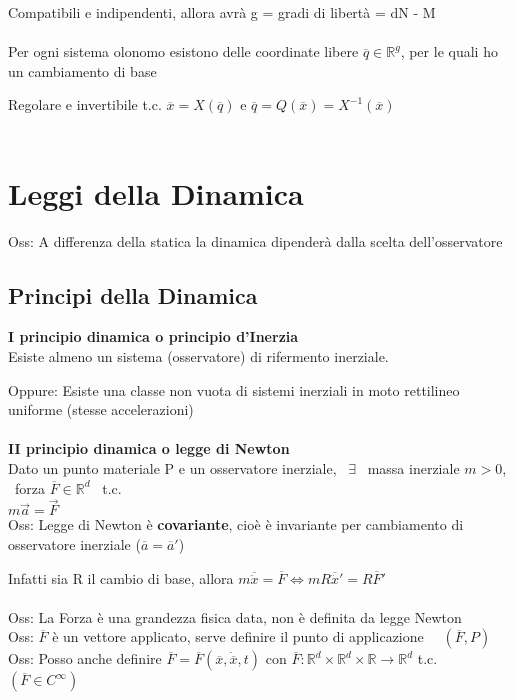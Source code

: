 \documentclass{article}
\begin{document}
Compatibili e indipendenti, allora avrà g = gradi di libertà = dN - M \\ \\
%
%
%
Per ogni sistema olonomo esistono delle coordinate libere $\overline{q} \in \mathbb{R}^g$, per le quali ho un cambiamento di base

Regolare e invertibile t.c. $\overline{x}=X(\overline{q})$ e $\overline{q}=Q(\overline{x})=X^{-1}(\overline{x})$ \\ \\
%
%
%



\section{Leggi della Dinamica}

Oss: A differenza della statica la dinamica dipenderà dalla scelta dell'osservatore
\subsection{Principi della Dinamica}
%
%
\textbf{I principio dinamica o principio d'Inerzia}\\
Esiste almeno un sistema (osservatore) di rifermento inerziale.

Oppure: Esiste una classe non vuota di sistemi inerziali in moto rettilineo uniforme (stesse accelerazioni) \\ \\
%
%
%
\textbf{II principio dinamica o legge di Newton}\\
Dato un punto materiale P e un osservatore inerziale, \ $\exists$ \ massa inerziale $m>0$, \ forza $\overline{F}\in\mathbb{R}^d$ \ t.c. \\
\phantom{} \hspace{2in} $m\overrightarrow{a}=\overrightarrow{F}$\\
%
%
Oss: Legge di Newton è \textbf{covariante}, cioè è invariante per cambiamento di osservatore inerziale ($\overline{a}=\overline{a}'$)

Infatti sia R il cambio di base, allora $m\overline{\ddot{x}}=\overline{F} \Leftrightarrow mR\overline{\ddot{x}}'=R\overline{F}'$ \\ \\
%
%
%
Oss: La Forza è una grandezza fisica data, non è definita da legge Newton \\
Oss: $\overline{F}$ è un vettore applicato, serve definire il punto di applicazione \ \ $(\overline{F},P)$\\
Oss: Posso anche definire $\overline{F}=\overline{F}(\overline{x},\dot{\overline{x}},t)$ con $\overline{F}:\mathbb{R}^d\times\mathbb{R}^d\times\mathbb{R}\rightarrow\mathbb{R}^d$ t.c. $(\overline{F} \in C^\infty)$
\end{document}
